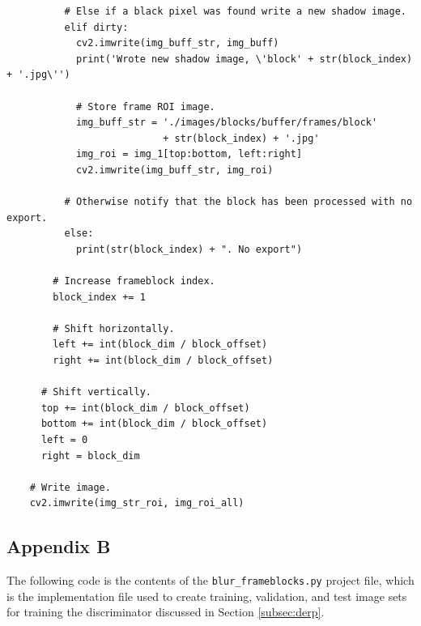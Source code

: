 \documentclass[conference]{IEEEtran}
\begin{document}
\begin{verbatim}
          # Else if a black pixel was found write a new shadow image.
          elif dirty:
            cv2.imwrite(img_buff_str, img_buff)
            print('Wrote new shadow image, \'block' + str(block_index) + '.jpg\'')

            # Store frame ROI image.
            img_buff_str = './images/blocks/buffer/frames/block'
                           + str(block_index) + '.jpg'
            img_roi = img_1[top:bottom, left:right]
            cv2.imwrite(img_buff_str, img_roi)

          # Otherwise notify that the block has been processed with no export.
          else:
            print(str(block_index) + ". No export")

        # Increase frameblock index.
        block_index += 1
        
        # Shift horizontally.
        left += int(block_dim / block_offset)
        right += int(block_dim / block_offset)

      # Shift vertically.
      top += int(block_dim / block_offset)
      bottom += int(block_dim / block_offset)
      left = 0
      right = block_dim

    # Write image.
    cv2.imwrite(img_str_roi, img_roi_all)
\end{verbatim}

\pagebreak

\begin{center}
\section*{Appendix B}
\label{app:b}
\end{center}

The following code is the contents of the
\texttt{blur_frameblocks.py} project file, which is the
implementation file used to create training, validation, and test image sets for
training the discriminator discussed in Section \ref{subsec:derp}.

\bigskip
\end{document}
